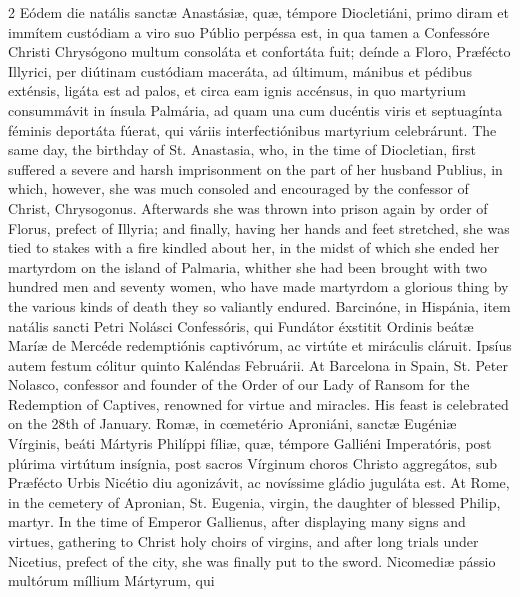 \begin{paracol}{2}
Eódem die natális sanctæ Anastásiæ, quæ, 
 témpore Diocletiáni, primo diram et immítem custódiam a viro suo Públio 
 perpéssa est, in qua tamen a Confessóre Christi Chrysógono multum consoláta 
 et confortáta fuit; deínde a Floro, Præfécto Illyrici, per diútinam 
 custódiam maceráta, ad últimum, mánibus et pédibus exténsis, ligáta est ad 
 palos, et circa eam ignis accénsus, in quo martyrium consummávit in ínsula 
 Palmária, ad quam una cum ducéntis viris et septuagínta féminis deportáta 
 fúerat, qui váriis interfectiónibus martyrium celebrárunt.
\switchcolumn
{}
The same day, the birthday of St. Anastasia, who, in the time of Diocletian, 
 first suffered a severe and harsh imprisonment on the part of her husband 
 Publius, in which, however, she was much consoled and encouraged by the 
 confessor of Christ, Chrysogonus. Afterwards she was thrown into 
 prison again by order of Florus, prefect of Illyria; and finally, having her 
 hands and feet stretched, she was tied to stakes with a fire kindled about 
 her, in the midst of which she ended her martyrdom on the island of Palmaria, 
 whither she had been brought with two hundred men and seventy women, who 
 have made martyrdom a glorious thing by the various kinds of death they so 
 valiantly endured.
\switchcolumn*
{}
Barcinóne, in Hispánia, item natális sancti Petri Nolásci Confessóris, qui 
 Fundátor éxstitit Ordinis beátæ Maríæ de 
 Mercéde redemptiónis captivórum, ac virtúte et miráculis cláruit. 
 Ipsíus autem festum cólitur quinto Kaléndas Februárii.
\switchcolumn
{}
At Barcelona in Spain, St. Peter Nolasco, confessor and founder of the Order 
 of our Lady of Ransom for the Redemption of Captives, renowned for virtue 
 and miracles. His feast is celebrated on the 28th of January.
\switchcolumn*
{}
Romæ, in cœmetério Aproniáni, sanctæ Eugéniæ 
 Vírginis, beáti Mártyris Philíppi fíliæ, quæ, témpore Galliéni Imperatóris, 
 post plúrima virtútum insígnia, post sacros Vírginum choros Christo 
 aggregátos, sub Præfécto Urbis Nicétio diu agonizávit, ac novíssime gládio 
 juguláta est.
\switchcolumn
{}
At Rome, in the cemetery of Apronian, St. Eugenia, virgin, the daughter of 
 blessed Philip, martyr. In the time of Emperor Gallienus, after 
 displaying many signs and virtues, gathering to Christ holy choirs of 
 virgins, and after long trials under Nicetius, prefect of the city, she was 
 finally put to the sword.
\switchcolumn*
{}
Nicomediæ pássio multórum míllium Mártyrum, qui 

\end{paracol}
